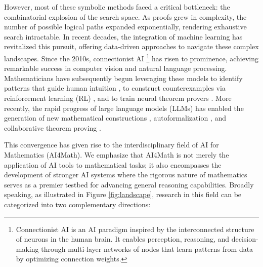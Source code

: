 \documentclass[11pt]{article}
\numberwithin{equation}{section}
\begin{document}
However, most of these symbolic methods faced a critical bottleneck: the combinatorial explosion of the search space. As proofs grew in complexity, the number of possible logical paths expanded exponentially, rendering exhaustive search intractable. In recent decades, the integration of machine learning has revitalized this pursuit, offering data-driven approaches to navigate these complex landscapes. Since the 2010s, connectionist AI \footnote{Connectionist AI is an AI paradigm inspired by the interconnected structure of neurons in the human brain. It enables perception, reasoning, and decision-making through multi-layer networks of nodes that learn patterns from data by optimizing connection weights.} has risen to prominence, achieving remarkable success in computer vision and natural language processing. Mathematicians have subsequently begun leveraging these models to identify patterns that guide human intuition \cite{davies2021advancing,hashemi2025can,dong2024machine}, to construct counterexamples via reinforcement learning (RL) \cite{wagner2021constructions,Gukov_2025,shehper2025what}, and to train neural theorem provers \cite{whalen2016holophrasm,bansal2019holist}. More recently, the rapid progress of large language models (LLMs) has enabled the generation of new mathematical constructions \cite{romera2024mathematical, novikov2025alphaevolve,georgiev2025mathematical}, autoformalization \cite{wu2022autoformalization,mathinc_gauss}, and collaborative theorem proving \cite{zhou2025solving}.

This convergence has given rise to the interdisciplinary field of AI for Mathematics (AI4Math). We emphasize that AI4Math is not merely the application of AI tools to mathematical tasks; it also encompasses the development of stronger AI systems where the rigorous nature of mathematics serves as a premier testbed for advancing general reasoning capabilities. Broadly speaking, as illustrated in Figure \ref{fig:landscape}, research in this field can be categorized into two complementary directions:
\end{document}
